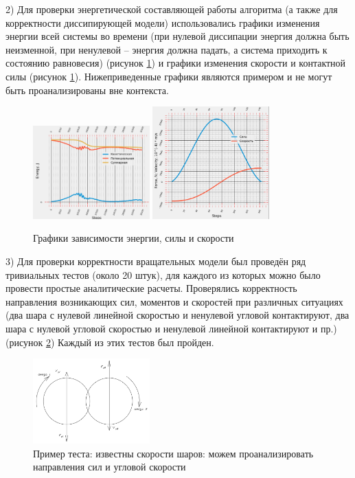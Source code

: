 \documentclass[utf8x, 14pt, oneside, a4paper]{article}
\begin{document}
2) Для проверки энергетической составляющей работы алгоритма (а также для корректности диссипирующей модели) использовались графики изменения энергии всей системы во времени (при нулевой диссипации энергия должна быть неизменной, при ненулевой -- энергия должна падать, а система приходить к состоянию равновесия) (рисунок \ref{pic:graphs}) и графики изменения скорости и контактной силы (рисунок \ref{pic:graphs}). Нижеприведенные графики являются примером и не могут быть проанализированы вне контекста.


\begin{figure}[h!]
	\centering
	\includegraphics[width=0.4\textwidth , height=0.25\textheight]{graph1} 
	\includegraphics[width=0.4\textwidth , height=0.25\textheight]{graph2}
	\caption{Графики зависимости энергии, силы и скорости}
	\label{pic:graphs}
\end{figure} 

3) Для проверки корректности вращательных модели был проведён ряд тривиальных тестов (около 20 штук), для каждого из которых можно было провести простые аналитические расчеты. 
Проверялись корректность направления возникающих сил, моментов и скоростей при различных ситуациях (два шара с нулевой линейной скоростью и ненулевой угловой контактируют, два шара с нулевой угловой скоростью и ненулевой линейной контактируют и пр.) (рисунок \ref{pic:test_primer})
Каждый из этих тестов был пройден.

\begin{figure}[H]
	\centering
	\includegraphics[width=0.4\textwidth]{test_primer} 
	\caption{Пример теста: известны скорости шаров: можем проанализировать направления сил и угловой скорости}
	\label{pic:test_primer}
\end{figure} 
\end{document}

